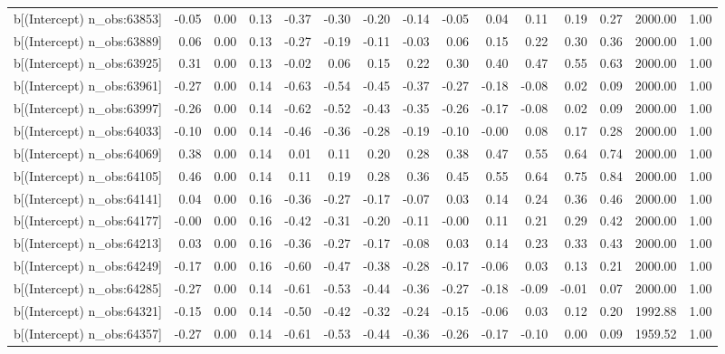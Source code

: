 \begin{table}[ht]
\begin{tabular}{rrrrrrrrrrrrrrr}
  b[(Intercept) n\_obs:63853] & -0.05 & 0.00 & 0.13 & -0.37 & -0.30 & -0.20 & -0.14 & -0.05 & 0.04 & 0.11 & 0.19 & 0.27 & 2000.00 & 1.00 \\ 
  b[(Intercept) n\_obs:63889] & 0.06 & 0.00 & 0.13 & -0.27 & -0.19 & -0.11 & -0.03 & 0.06 & 0.15 & 0.22 & 0.30 & 0.36 & 2000.00 & 1.00 \\ 
  b[(Intercept) n\_obs:63925] & 0.31 & 0.00 & 0.13 & -0.02 & 0.06 & 0.15 & 0.22 & 0.30 & 0.40 & 0.47 & 0.55 & 0.63 & 2000.00 & 1.00 \\ 
  b[(Intercept) n\_obs:63961] & -0.27 & 0.00 & 0.14 & -0.63 & -0.54 & -0.45 & -0.37 & -0.27 & -0.18 & -0.08 & 0.02 & 0.09 & 2000.00 & 1.00 \\ 
  b[(Intercept) n\_obs:63997] & -0.26 & 0.00 & 0.14 & -0.62 & -0.52 & -0.43 & -0.35 & -0.26 & -0.17 & -0.08 & 0.02 & 0.09 & 2000.00 & 1.00 \\ 
  b[(Intercept) n\_obs:64033] & -0.10 & 0.00 & 0.14 & -0.46 & -0.36 & -0.28 & -0.19 & -0.10 & -0.00 & 0.08 & 0.17 & 0.28 & 2000.00 & 1.00 \\ 
  b[(Intercept) n\_obs:64069] & 0.38 & 0.00 & 0.14 & 0.01 & 0.11 & 0.20 & 0.28 & 0.38 & 0.47 & 0.55 & 0.64 & 0.74 & 2000.00 & 1.00 \\ 
  b[(Intercept) n\_obs:64105] & 0.46 & 0.00 & 0.14 & 0.11 & 0.19 & 0.28 & 0.36 & 0.45 & 0.55 & 0.64 & 0.75 & 0.84 & 2000.00 & 1.00 \\ 
  b[(Intercept) n\_obs:64141] & 0.04 & 0.00 & 0.16 & -0.36 & -0.27 & -0.17 & -0.07 & 0.03 & 0.14 & 0.24 & 0.36 & 0.46 & 2000.00 & 1.00 \\ 
  b[(Intercept) n\_obs:64177] & -0.00 & 0.00 & 0.16 & -0.42 & -0.31 & -0.20 & -0.11 & -0.00 & 0.11 & 0.21 & 0.29 & 0.42 & 2000.00 & 1.00 \\ 
  b[(Intercept) n\_obs:64213] & 0.03 & 0.00 & 0.16 & -0.36 & -0.27 & -0.17 & -0.08 & 0.03 & 0.14 & 0.23 & 0.33 & 0.43 & 2000.00 & 1.00 \\ 
  b[(Intercept) n\_obs:64249] & -0.17 & 0.00 & 0.16 & -0.60 & -0.47 & -0.38 & -0.28 & -0.17 & -0.06 & 0.03 & 0.13 & 0.21 & 2000.00 & 1.00 \\ 
  b[(Intercept) n\_obs:64285] & -0.27 & 0.00 & 0.14 & -0.61 & -0.53 & -0.44 & -0.36 & -0.27 & -0.18 & -0.09 & -0.01 & 0.07 & 2000.00 & 1.00 \\ 
  b[(Intercept) n\_obs:64321] & -0.15 & 0.00 & 0.14 & -0.50 & -0.42 & -0.32 & -0.24 & -0.15 & -0.06 & 0.03 & 0.12 & 0.20 & 1992.88 & 1.00 \\ 
  b[(Intercept) n\_obs:64357] & -0.27 & 0.00 & 0.14 & -0.61 & -0.53 & -0.44 & -0.36 & -0.26 & -0.17 & -0.10 & 0.00 & 0.09 & 1959.52 & 1.00 \\ 

\end{tabular}
\end{table}

